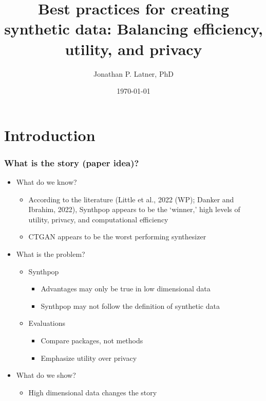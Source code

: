 \documentclass[xcolor=table]{beamer}
\author{Jonathan P. Latner, PhD}
\title{Best practices for creating synthetic data: Balancing efficiency, utility, and privacy}
\date{\today}
\begin{document}
\section{Introduction}\label{sec:intro}
\frame{\frametitle{ }
\titlepage
\thispagestyle{empty}
}

\begin{frame}
\frametitle{What is the story (paper idea)?}
\begin{minipage}{\textwidth}
\begin{itemize}
    \item What do we know?
    \begin{itemize}
        \item According to the literature (Little et al., 2022 (WP); Danker and Ibrahim, 2022), Synthpop appears to be the `winner,' high levels of utility, privacy, and computational efficiency
         \item CTGAN appears to be the worst performing synthesizer
    \end{itemize}
    \item What is the problem?
    \begin{itemize}
        \item Synthpop
        \begin{itemize}
            \item Advantages may only be true in low dimensional data
            \item Synthpop may not follow the definition of synthetic data
        \end{itemize}
        \item Evaluations
        \begin{itemize}
            \item Compare packages, not methods
            \item Emphasize utility over privacy
        \end{itemize}
    \end{itemize}
    \item What do we show?
    \begin{itemize}
        \item High dimensional data changes the story

\end{itemize}
\end{itemize}
\end{minipage}
\end{frame}
\end{document}
